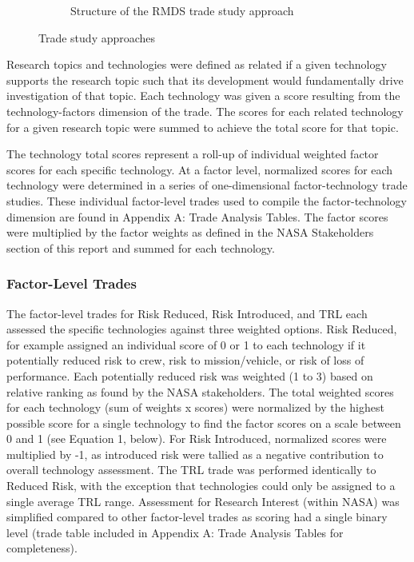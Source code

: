 \begin{figure}[tb!]
\begin{center}
\begin{subfigure}{0.49\textwidth}
            \caption{Structure of the RMDS trade study approach}
            \label{figure-hari:tradestudyB}
        \end{subfigure}
        \caption{Trade study approaches}
        \label{figure-hari:tradestudy}
    \end{center}
\end{figure}

Research topics and technologies were defined as related if a given technology supports the research topic such that its development would fundamentally drive investigation of that topic.
Each technology was given a score resulting from the technology-factors dimension of the trade.
The scores for each related technology for a given research topic were summed to achieve the total score for that topic.

The technology total scores represent a roll-up of individual weighted factor scores for each specific technology.
At a factor level, normalized scores for each technology were determined in a series of one-dimensional factor-technology trade studies.
These individual factor-level trades used to compile the factor-technology dimension are found in Appendix A: Trade Analysis Tables.
The factor scores were multiplied by the factor weights as defined in the NASA Stakeholders section of this report and summed for each technology.

\subsubsection{Factor-Level Trades}
The factor-level trades for Risk Reduced, Risk Introduced, and TRL each assessed the specific technologies against three weighted options.
Risk Reduced, for example assigned an individual score of 0 or 1 to each technology if it potentially reduced risk to crew, risk to mission/vehicle, or risk of loss of performance.
Each potentially reduced risk was weighted (1 to 3) based on relative ranking as found by the NASA stakeholders.
The total weighted scores for each technology (sum of weights x scores) were normalized by the highest possible score for a single technology to find the factor scores on a scale between 0 and 1 (see Equation 1, below).
For Risk Introduced, normalized scores were multiplied by -1, as introduced risk were tallied as a negative contribution to overall technology assessment.
The TRL trade was performed identically to Reduced Risk, with the exception that technologies could only be assigned to a single average TRL range.
Assessment for Research Interest (within NASA) was simplified compared to other factor-level trades as scoring had a single binary level (trade table included in Appendix A: Trade Analysis Tables for completeness).

